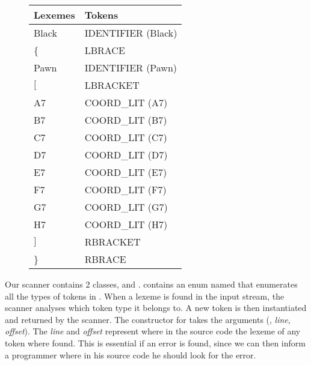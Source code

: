 \begin{figure}
\centering
\begin{tabular}{|l|l|}
        \hline
        Lexemes & Tokens             \\ \hline
        Black   & IDENTIFIER (Black) \\ 
        \{       & LBRACE             \\ 
        Pawn    & IDENTIFIER (Pawn)  \\ 
        $[$       & LBRACKET           \\ 
        A7      & COORD\_LIT (A7)     \\ 
        B7      & COORD\_LIT (B7)     \\ 
        C7      & COORD\_LIT (C7)     \\ 
        D7      & COORD\_LIT (D7)     \\ 
        E7      & COORD\_LIT (E7)     \\ 
        F7      & COORD\_LIT (F7)     \\ 
        G7      & COORD\_LIT (G7)     \\ 
        H7      & COORD\_LIT (H7)     \\ 
        $]$       & RBRACKET           \\ 
        \}       & RBRACE             \\
        \hline
\end{tabular}
\label{table:lexemestotokens}
\end{figure}

Our scanner contains 2 classes,  and .  contains an enum named  that enumerates all the types of tokens in \productname{}. When a lexeme is found in the input stream, the scanner analyses which token type it belongs to. A new token is then instantiated and returned by the scanner. The constructor for  takes the arguments (, \textit{line}, \textit{offset}). The \textit{line} and \textit{offset} represent where in the source code the lexeme of any token where found. This is essential if an error is found, since we can then inform a programmer where in his source code he should look for the error.
 
